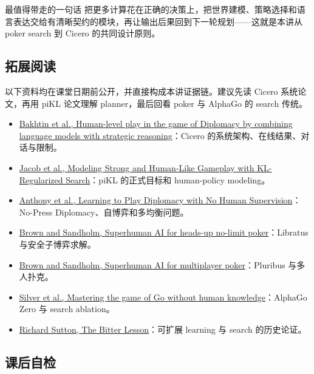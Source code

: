 \begin{importantbox}{最值得带走的一句话}
把更多计算花在正确的决策上，把世界建模、策略选择和语言表达交给有清晰契约的模块，再让输出后果回到下一轮规划——这就是本讲从 poker search 到 Cicero 的共同设计原则。
\end{importantbox}

\subsection{拓展阅读}

以下资料均在课堂日期前公开，并直接构成本讲证据链。建议先读 Cicero 系统论文，再用 piKL 论文理解 planner，最后回看 poker 与 AlphaGo 的 search 传统。

\begin{itemize}
  \item \href{https://www.science.org/doi/full/10.1126/science.ade9097}{Bakhtin et al., Human-level play in the game of Diplomacy by combining language models with strategic reasoning}：Cicero 的系统架构、在线结果、对话与限制。
  \item \href{https://proceedings.mlr.press/v162/jacob22a.html}{Jacob et al., Modeling Strong and Human-Like Gameplay with KL-Regularized Search}：piKL 的正式目标和 human-policy modeling。
  \item \href{https://proceedings.neurips.cc/paper/2021/hash/95f2b84de5660ddf45c8a34933a2e66f-Abstract.html}{Anthony et al., Learning to Play Diplomacy with No Human Supervision}：No-Press Diplomacy、自博弈和多均衡问题。
  \item \href{https://www.science.org/doi/10.1126/science.aao1733}{Brown and Sandholm, Superhuman AI for heads-up no-limit poker}：Libratus 与安全子博弈求解。
  \item \href{https://www.science.org/doi/10.1126/science.aay2400}{Brown and Sandholm, Superhuman AI for multiplayer poker}：Pluribus 与多人扑克。
  \item \href{https://www.science.org/doi/10.1126/science.aar6404}{Silver et al., Mastering the game of Go without human knowledge}：AlphaGo Zero 与 search ablation。
  \item \href{http://www.incompleteideas.net/IncIdeas/BitterLesson.html}{Richard Sutton, The Bitter Lesson}：可扩展 learning 与 search 的历史论证。
\end{itemize}

\subsection{课后自检}

